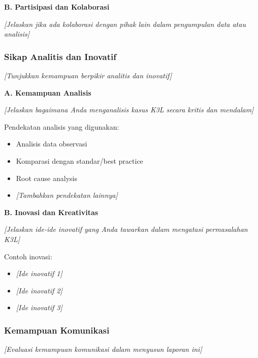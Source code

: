 \vspace{0.5cm}

\textbf{B. Partisipasi dan Kolaborasi}

\textit{[Jelaskan jika ada kolaborasi dengan pihak lain dalam pengumpulan data atau analisis]}

\vspace{0.5cm}

\subsubsection{Sikap Analitis dan Inovatif}

\textit{[Tunjukkan kemampuan berpikir analitis dan inovatif]}

\textbf{A. Kemampuan Analisis}

\textit{[Jelaskan bagaimana Anda menganalisis kasus K3L secara kritis dan mendalam]}

Pendekatan analisis yang digunakan:
\begin{itemize}
    \item Analisis data observasi
    \item Komparasi dengan standar/best practice
    \item Root cause analysis
    \item \textit{[Tambahkan pendekatan lainnya]}
\end{itemize}

\vspace{0.5cm}

\textbf{B. Inovasi dan Kreativitas}

\textit{[Jelaskan ide-ide inovatif yang Anda tawarkan dalam mengatasi permasalahan K3L]}

Contoh inovasi:
\begin{itemize}
    \item \textit{[Ide inovatif 1]}
    \item \textit{[Ide inovatif 2]}
    \item \textit{[Ide inovatif 3]}
\end{itemize}

\vspace{0.5cm}

\subsubsection{Kemampuan Komunikasi}

\textit{[Evaluasi kemampuan komunikasi dalam menyusun laporan ini]}

